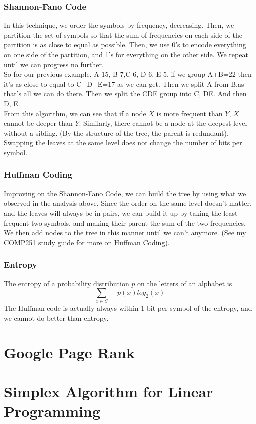 \documentclass[12pt]{article}
\theoremstyle{definition}
\begin{document}
\subsubsection{Shannon-Fano Code}
In this technique, we order the symbols by frequency, decreasing. Then, we partition the set of symbols so that the sum of frequencies on each side of the partition is as close to equal as possible. Then, we use 0's to encode everything on one side of the partition, and 1's for everything on the other side. We repeat until we can progress no further.
\\ \linebreak
So for our previous example, A-15, B-7,C-6, D-6, E-5, if we group A+B=22 then it's as close to equal to C+D+E=17 as we can get. Then we split A from B,as that's all we can do there. Then we split the CDE group into C, DE. And then D, E. 
\\ \linebreak
From this algorithm, we can see that if a node $X$ is more frequent than $Y$, $X$ cannot be deeper than $Y$. Similarly, there cannot be a node at the deepest level without a sibling. (By the structure of the tree, the parent is redundant). Swapping the leaves at the same level does not change the number of bits per symbol.

\subsubsection{Huffman Coding}
Improving on the Shannon-Fano Code, we can build the tree by using what we observed in the analysis above. Since the order on the same level doesn't matter, and the leaves will always be in pairs, we can build it up by taking the least frequent two symbols, and making their parent the sum of the two frequencies. We then add nodes to the tree in this manner until we can't anymore. (See my COMP251 study guide for more on Huffman Coding).

\subsubsection{Entropy}
The entropy of a probability distribution $p$ on the letters of an alphabet is 
$$\sum_{x \in S}-p(x)log_2(x)$$
The Huffman code is actually always within 1 bit per symbol of the entropy, and we cannot do better than entropy. 

\section{Google Page Rank}
\section{Simplex Algorithm for Linear Programming}
\end{document}

